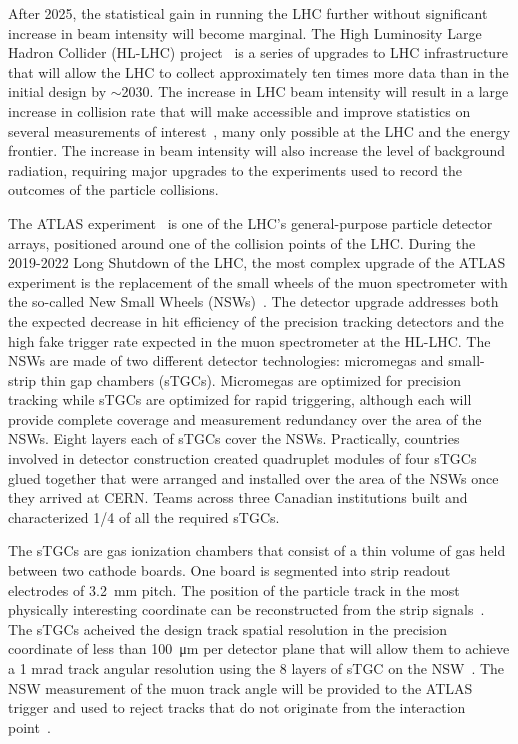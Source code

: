 After 2025, the statistical gain in running the LHC further without significant increase in beam intensity will become marginal. The High Luminosity Large Hadron Collider (HL-LHC) project~\cite{hl_lhc_tdr} is a series of upgrades to LHC infrastructure that will allow the LHC to collect approximately ten times more data than in the initial design by $\sim$2030. The increase in LHC beam intensity will result in a large increase in collision rate that will make accessible and improve statistics on several measurements of interest~\cite{dainese_physics_2018}, many only possible at the LHC and the energy frontier. The increase in beam intensity will also increase the level of background radiation, requiring major upgrades to the experiments used to record the outcomes of the particle collisions.

The ATLAS experiment~\cite{collaboration_atlas_2008} is one of the LHC's general-purpose particle detector arrays, positioned around one of the collision points of the LHC.  During the 2019-2022 Long Shutdown of the LHC, the most complex upgrade of the ATLAS experiment is the replacement of the small wheels of the muon spectrometer with the so-called New Small Wheels (NSWs)~\cite{nsw_tdr}. The detector upgrade addresses both the expected decrease in hit efficiency of the precision tracking detectors and the high fake trigger rate expected in the muon spectrometer at the HL-LHC. The NSWs are made of two different detector technologies: micromegas and small-strip thin gap chambers (sTGCs). Micromegas are optimized for precision tracking while sTGCs are optimized for rapid triggering, although each will provide complete coverage and measurement redundancy over the area of the NSWs. Eight layers each of sTGCs cover the NSWs. Practically, countries involved in detector construction created quadruplet modules of four sTGCs glued together that were arranged and installed over the area of the NSWs once they arrived at CERN. Teams across three Canadian institutions built and characterized 1/4 of all the required sTGCs.

The sTGCs are gas ionization chambers that consist of a thin volume of gas held between two cathode boards. One board is segmented into strip readout electrodes of \SI{3.2}{mm} pitch.  The position of the particle track in the most physically interesting coordinate can be reconstructed from the strip signals~\cite{nsw_tdr}. The sTGCs acheived the design track spatial resolution in the precision coordinate of less than \SI{100}{\micro\meter} per detector plane that will allow them to achieve a 1 mrad track angular resolution using the 8 layers of sTGC on the NSW~\cite{abusleme_performance_2016, nsw_tdr}. The NSW measurement of the muon track angle will be provided to the  ATLAS trigger and used to reject tracks that do not originate from the interaction point~\cite{nsw_tdr}.


